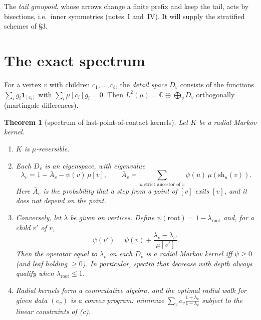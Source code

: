 \documentclass[11pt]{article}
\newtheorem{theorem}{Theorem}[section]
\theoremstyle{definition}
\theoremstyle{remark}
\begin{document}
The \emph{tail groupoid}, whose arrows change a finite prefix and keep the tail, acts by bisections, i.e.\ inner symmetries (notes~I and~IV). It will supply the stratified schemes of \S3.

\section{The exact spectrum}

For a vertex $v$ with children $c_1,\dots,c_b$, the \emph{detail space} $D_v$ consists of the functions $\sum_ig_i\mathbf 1_{[c_i]}$ with $\sum_i\mu[c_i]g_i=0$. Then $L^2(\mu)=\mathbb C\oplus\bigoplus_vD_v$ orthogonally (martingale differences).

\begin{theorem}[spectrum of last-point-of-contact kernels]\label{thm:spec}
Let $K$ be a radial Markov kernel.
\begin{enumerate}
\item[(a)] $K$ is $\mu$-reversible.
\item[(b)] Each $D_v$ is an eigenspace, with eigenvalue
\[\lambda_v=1-\bar A_v-\psi(v)\,\mu[v],\qquad\bar A_v=\sum_{u\text{ strict ancestor of }v}\psi(u)\,\mu(\mathrm{sh}_u(v)).\]
Here $\bar A_v$ is the probability that a step from a point of $[v]$ exits $[v]$, and it does not depend on the point.
\item[(c)] Conversely, let $\lambda$ be given on vertices. Define $\psi(\text{root})=1-\lambda_{\text{root}}$ and, for a child $v'$ of $v$,
\[\psi(v')=\psi(v)+\frac{\lambda_v-\lambda_{v'}}{\mu[v']}.\]
Then the operator equal to $\lambda_v$ on each $D_v$ is a radial Markov kernel iff $\psi\ge0$ (and leaf holding $\ge0$). In particular, spectra that decrease with depth always qualify when $\lambda_{\text{root}}\le1$.
\item[(d)] Radial kernels form a commutative algebra, and the optimal radial walk for given data $(e_v)$ is a convex program: minimize $\sum_ve_v\frac{1+\lambda_v}{1-\lambda_v}$ subject to the linear constraints of (c).
\end{enumerate}
\end{theorem}
\end{document}
